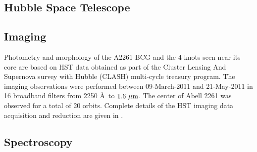 \documentclass[useAMS,usenatbib]{emulateapj}
\newcommand{\src}{BCG\,2261}
\begin{document}



\subsection{Hubble Space Telescope}\label{sec:HSTdata}

\subsection{Imaging}

Photometry and morphology of the A2261 BCG and the 4 knots seen near its core are based on HST data obtained as part of the Cluster Lensing And Supernova survey with Hubble (CLASH) multi-cycle treasury program. The imaging observations were performed between 09-March-2011 and 21-May-2011 in 16 broadband filters from 2250 \AA\ to $1.6~\mu{\rm m}$. The center of Abell 2261 was observed for a total of 20 orbits. Complete details of the HST imaging data acquisition and reduction are given in \cite{clash}.

\subsection{Spectroscopy}
\end{document}
